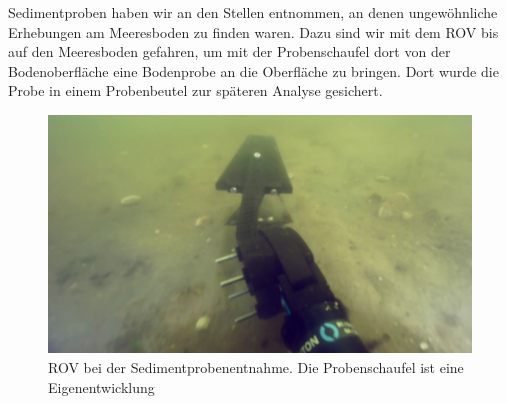  

Sedimentproben haben wir an den Stellen entnommen, an denen ungewöhnliche Erhebungen am Meeresboden zu finden waren. 
Dazu sind wir mit dem ROV bis auf den Meeresboden gefahren, um mit der Probenschaufel dort von der Bodenoberfläche eine Bodenprobe an die Oberfläche zu bringen. Dort wurde die Probe in einem Probenbeutel zur späteren Analyse gesichert.

\begin{figure}[htb]
\includegraphics[height=\textheight,%
                   width=\textwidth,%
                   keepaspectratio]{Bilder/ROV/Sedimentprobe3.png}
\caption{ROV bei der Sedimentprobenentnahme. Die Probenschaufel ist eine Eigenentwicklung}
\end{figure}